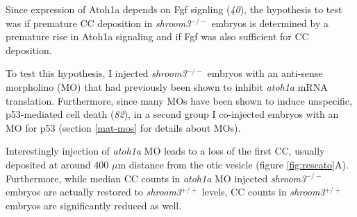 \documentclass[11pt,singlespacinge,twoside]{reedthesis} %
\theoremstyle{definition}
\theoremstyle{definition}
\theoremstyle{definition}
\theoremstyle{remark}
\begin{document}
Since expression of Atoh1a depends on Fgf signling (\emph{40}), the hypothesis to test was if premature CC deposition in \emph{shroom3}\(^{-/-}\) embryos is determined by a premature rise in Atoh1a signaling and if Fgf was also sufficient for CC deposition.

To test this hypothesis, I injected \emph{shroom3}\(^{-/-}\) embryos with an anti-sense morpholino (MO) that had previously been shown to inhibit \emph{atoh1a} mRNA translation. Furthermore, since many MOs have been shown to induce unspecific, p53-mediated cell death (\emph{82}), in a second group I co-injected embryos with an MO for p53 (section \ref{mat-mos} for details about MOs).

Interestingly injection of \emph{atoh1a} MO leads to a loss of the first CC, usually deposited at around 400 \(\mu\)m distance from the otic vesicle (figure \ref{fig:rescato}A). Furthermore, while median CC counts in \emph{atoh1a} MO injected \emph{shroom3}\(^{-/-}\) embryos are actually restored to \emph{shroom3}\(^{+/+}\) levels, CC counts in \emph{shroom3}\(^{+/+}\) embryos are significantly reduced as well.\newline
\end{document}
